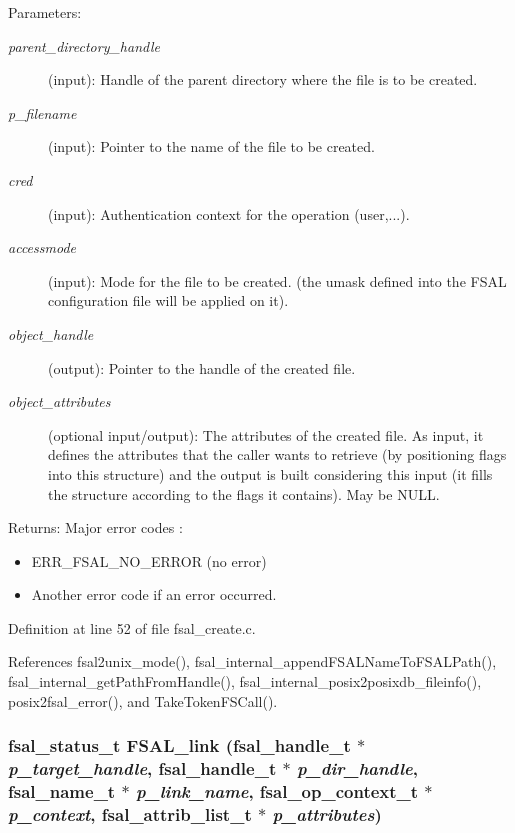 \begin{Desc}
\item[Parameters:]
\begin{description}
\item[{\em parent\_\-directory\_\-handle}](input): Handle of the parent directory where the file is to be created. \item[{\em p\_\-filename}](input): Pointer to the name of the file to be created. \item[{\em cred}](input): Authentication context for the operation (user,...). \item[{\em accessmode}](input): Mode for the file to be created. (the umask defined into the FSAL configuration file will be applied on it). \item[{\em object\_\-handle}](output): Pointer to the handle of the created file. \item[{\em object\_\-attributes}](optional input/output): The attributes of the created file. As input, it defines the attributes that the caller wants to retrieve (by positioning flags into this structure) and the output is built considering this input (it fills the structure according to the flags it contains). May be NULL.\end{description}
\end{Desc}
\begin{Desc}
\item[Returns:]Major error codes :\begin{itemize}
\item ERR\_\-FSAL\_\-NO\_\-ERROR (no error)\item Another error code if an error occurred. \end{itemize}
\end{Desc}


Definition at line 52 of file fsal\_\-create.c.

References fsal2unix\_\-mode(), fsal\_\-internal\_\-appendFSALNameToFSALPath(), fsal\_\-internal\_\-getPathFromHandle(), fsal\_\-internal\_\-posix2posixdb\_\-fileinfo(), posix2fsal\_\-error(), and TakeTokenFSCall().
\subsubsection[{FSAL\_\-link}]{\setlength{\rightskip}{0pt plus 5cm}fsal\_\-status\_\-t FSAL\_\-link (fsal\_\-handle\_\-t $\ast$ {\em p\_\-target\_\-handle}, \/  fsal\_\-handle\_\-t $\ast$ {\em p\_\-dir\_\-handle}, \/  fsal\_\-name\_\-t $\ast$ {\em p\_\-link\_\-name}, \/  fsal\_\-op\_\-context\_\-t $\ast$ {\em p\_\-context}, \/  fsal\_\-attrib\_\-list\_\-t $\ast$ {\em p\_\-attributes})}\label{fsal__create_8c_53044ec7fea7dda184aaad8c2d49f636}


